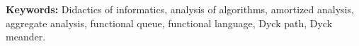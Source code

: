 \bigskip

\noindent\textbf{Keywords:} Didactics of informatics, analysis of
algorithms, amortized analysis, aggregate analysis, functional queue,
functional language, Dyck path, Dyck meander.

